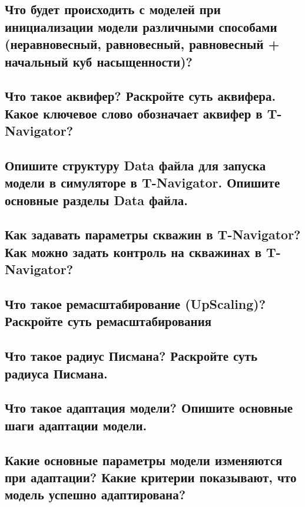 \documentclass[main.tex]{subfiles}
\begin{document}
\newpage

\subsection{Что будет происходить с моделей при инициализации модели различными способами (неравновесный, равновесный, равновесный + начальный куб насыщенности)?}

\newpage

\subsection{Что такое аквифер? Раскройте суть аквифера. Какое ключевое слово обозначает аквифер в T-Navigator?}

\newpage

\subsection{Опишите структуру Data файла для запуска модели в симуляторе в T-Navigator. Опишите основные разделы Data файла.}

\newpage

\subsection{Как задавать параметры скважин в T-Navigator? Как можно задать контроль на скважинах в T-Navigator?}

\newpage

\subsection{Что такое ремасштабирование (UpScaling)? Раскройте суть ремасштабирования}

\newpage

\subsection{Что такое радиус Писмана? Раскройте суть радиуса Писмана.}

\newpage

\subsection{Что такое адаптация модели? Опишите основные шаги адаптации модели.}

\newpage

\subsection{Какие основные параметры модели изменяются при адаптации? Какие критерии показывают, что модель успешно адаптирована?}
\end{document}
